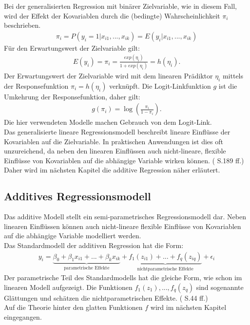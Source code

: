 \documentclass[12pt]{scrreprt}
\begin{document}
Bei der generalisierten Regression mit binärer Zielvariable, wie in diesem Fall, wird der Effekt der Kovariablen durch die (bedingte) Wahrscheinlichkeit $\pi_{i}$ beschrieben.
\begin{align}
\pi_{i}=P(y_{i}=1|x_{i1},...,x_{ik})=E(y_{i}|x_{i1},...,x_{ik})
\end{align}
Für den Erwartungswert der Zielvariable gilt:
\begin{align}
E(y_{i})=\pi_{i}=\frac{exp(\eta_{i})}{1+exp(\eta_{i})}=h(\eta_{i}).
\end{align}
Der Erwartungswert der Zielvariable wird mit dem linearen Prädiktor $\eta_{i}$ mittels der Responsefunktion $\pi_{i}=h(\eta_{i})$ verknüpft. Die Logit-Linkfunktion $g$ ist die Umkehrung der Responsefunktion, daher gilt:
\begin{align}
g(\pi_{i})=\log(\frac{\pi_{i}}{1-\pi_{i}}).
\end{align}
Die hier verwendeten Modelle machen Gebrauch von dem Logit-Link. \\
Das generalisierte lineare Regressionsmodell beschreibt lineare Einflüsse der Kovariablen auf die Zielvariable. In praktischen Anwendungen ist dies oft unzureichend, da neben den linearen Einflüssen auch nicht-lineare, flexible Einflüsse von Kovariablen auf die abhängige Variable wirken können. (\cite{fahrmeir2007regression} S.189 ff.) Daher wird im nächsten Kapitel die additive Regression näher erläutert.

\subsection{Additives Regressionsmodell}
Das additive Modell stellt ein semi-parametrisches Regressionsmodell dar. Neben linearen Einflüssen können auch nicht-lineare flexible Einﬂüsse von Kovariablen auf die abhängige Variable modelliert werden. \\
Das Standardmodell der additiven Regression hat die Form:
\begin{align}
y_{i}=\underbrace{\beta_{0}+\beta_{1}x_{i1}+...+\beta_{k}x_{ik}}_{\text{parametrische Effekte}}+ \underbrace{f_{1}(z_{i1})+...+f_{q}(z_{iq})}_{\text{nichtparametrische Effekte}}+\epsilon_{i}
\end{align}
Der parametrische Teil des Standardmodells hat die gleiche Form, wie schon im linearen Modell aufgezeigt. Die Funktionen $f_{1}(z_{1}),...,f_{q}(z_{q})$ sind sogenannte Glättungen und schätzen die nichtparametrischen Effekte. (\cite{fahrmeir2007regression} S.44 ff.) \\
Auf die Theorie hinter den glatten Funktionen $f$ wird im nächsten Kapitel eingegangen.
\end{document}
